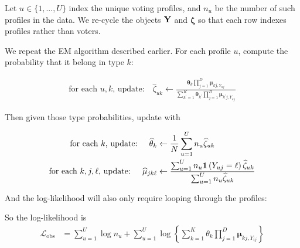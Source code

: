 \documentclass[11pt]{article}
\begin{document}
Let \(u \in \{1, ..., U\}\) index the unique voting profiles, and \(n_{u}\) be the number of such profiles in the data.  We re-cycle the objects \(\mathbf{Y}\) and \(\bm\zeta\) so that each row indexes profiles rather than voters.

We repeat the EM algorithm described earlier. For each profile \(u\), compute the probability that it belong in type \(k\):

\begin{align}
\text{for each \(u, k\), update: }~~~   \widehat\zeta_{uk} \leftarrow \frac{\bm{\theta}_{k}\prod^{D}_{j=1}\bm{\mu}_{kj,Y_{uj}}}
{\sum^{K}_{k^\prime=1}\bm{\theta}_{k^\prime}\prod^{D}_{j=1}\bm{\mu}_{k^\prime j,Y_{uj}}}
\end{align}

Then given those type probabilities, update with

\begin{align}
\text{for each \(k\), update: }~~~   \widehat{\theta}_{k} &\leftarrow \frac{1}{N}\sum^U_{u = 1}n_{u}\widehat{\zeta}_{uk}\\
\text{for each \(k, j, \ell\), update: }~~~   \widehat{\mu}_{jk\ell} &\leftarrow\frac{\sum^U_{u=1}n_{u}\bm{1}\left(Y_{uj} = \ell\right)\widehat{\zeta}_{uk}}{\sum^{U}_{u=1}n_{u}\widehat{\zeta}_{uk}}
\end{align}

And the log-likelihood will also only require looping through the profiles:

So the log-likelihood is
\begin{align}
\mathcal{L}_{\text{obs}} &= \sum^{U}_{u=1}\log n_u + \sum^{U}_{u=1}\log\left\{\sum^{K}_{k=1}\theta_k \prod^{D}_{j=1}\bm{\mu}_{kj,Y_{ij}}\right\}
\end{align}
\end{document}
